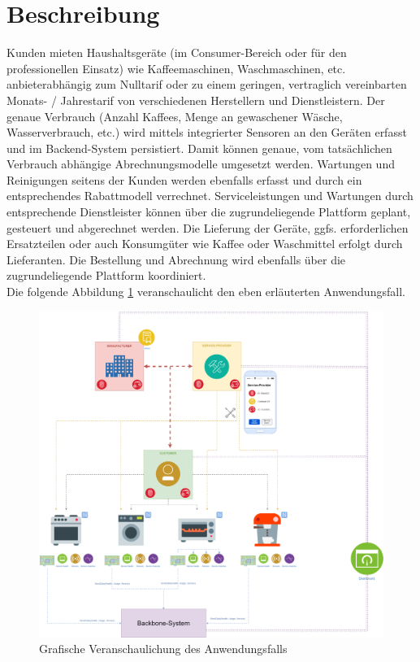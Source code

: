 \section{Beschreibung}
\label{sec:iot_usecase:description}
Kunden mieten Haushaltsgeräte (im Consumer-Bereich oder für den professionellen Einsatz) wie Kaffeemaschinen, Waschmaschinen, etc. anbieterabhängig zum Nulltarif oder zu einem geringen, vertraglich vereinbarten Monats- / Jahrestarif von verschiedenen Herstellern und Dienstleistern. Der genaue Verbrauch (Anzahl Kaffees, Menge an gewaschener Wäsche, Wasserverbrauch, etc.) wird mittels integrierter Sensoren an den Geräten erfasst und im Backend-System persistiert. Damit können genaue, vom tatsächlichen Verbrauch abhängige Abrechnungsmodelle umgesetzt werden. Wartungen und Reinigungen seitens der Kunden werden ebenfalls erfasst und durch ein entsprechendes Rabattmodell verrechnet. Serviceleistungen und Wartungen durch entsprechende Dienstleister können über die zugrundeliegende Plattform geplant, gesteuert und abgerechnet werden. Die Lieferung der Geräte, ggfs. erforderlichen Ersatzteilen oder auch Konsumgüter wie Kaffee oder Waschmittel erfolgt durch Lieferanten. Die Bestellung und Abrechnung wird ebenfalls über die zugrundeliegende Plattform koordiniert.\\
Die folgende Abbildung \ref{fig:chapter04:usecase} veranschaulicht den eben erläuterten Anwendungsfall.

\begin{figure}[htbp]
 \centering
 \includegraphics[width=1.0\textwidth]{gfx/IOT-Anwendungsfall.png}
 \caption{Grafische Veranschaulichung des Anwendungsfalls}
 \label{fig:chapter04:usecase}
\end{figure}


